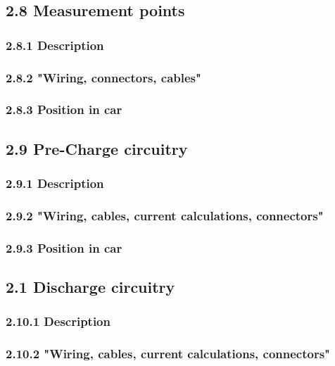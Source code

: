 \documentclass{article}
\begin{document}
\subsection*{2.8 Measurement points}

\subsubsection*{2.8.1 Description}

\subsubsection*{2.8.2 "Wiring, connectors, cables"}

\subsubsection*{2.8.3 Position in car}

\subsection*{2.9 Pre-Charge circuitry}

\subsubsection*{2.9.1 Description}

\subsubsection*{2.9.2 "Wiring, cables, current calculations, connectors"}

\subsubsection*{2.9.3 Position in car}

\subsection*{2.1 Discharge circuitry}

\subsubsection*{2.10.1 Description}

\subsubsection*{2.10.2 "Wiring, cables, current calculations, connectors"}
\end{document}
